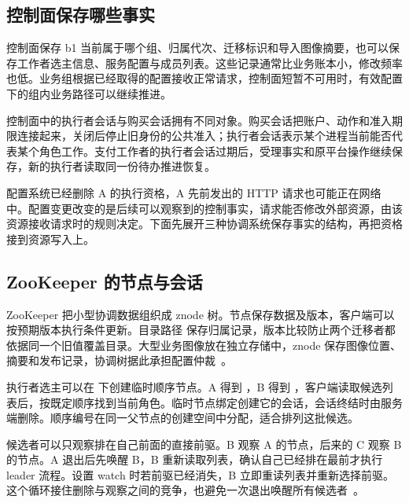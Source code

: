 \subsection*{控制面保存哪些事实}

控制面保存 b1 当前属于哪个组、归属代次、迁移标识和导入图像摘要，也可以保存工作者选主信息、服务配置与成员列表。这些记录通常比业务账本小，修改频率也低。业务组根据已经取得的配置接收正常请求，控制面短暂不可用时，有效配置下的组内业务路径可以继续推进。

控制面中的执行者会话与购买会话拥有不同对象。购买会话把账户、动作和准入期限连接起来，关闭后停止旧身份的公共准入；执行者会话表示某个进程当前能否代表某个角色工作。支付工作者的执行者会话过期后，受理事实和原平台操作继续保存，新的执行者读取同一份待办推进恢复。


配置系统已经删除 A 的执行资格，A 先前发出的 HTTP 请求也可能正在网络中。配置变更改变的是后续可以观察到的控制事实，请求能否修改外部资源，由该资源接收请求时的规则决定。下面先展开三种协调系统保存事实的结构，再把资格接到资源写入上。

\subsection*{ZooKeeper 的节点与会话}

ZooKeeper 把小型协调数据组织成 znode 树。节点保存数据及版本，客户端可以按预期版本执行条件更新。目录路径  保存归属记录，版本比较防止两个迁移者都依据同一个旧值覆盖目录。大型业务图像放在独立存储中，znode 保存图像位置、摘要和发布记录，协调树据此承担配置仲裁~\cite{zk-396-programmer}。

执行者选主可以在  下创建临时顺序节点。A 得到 ，B 得到 ，客户端读取候选列表后，按既定顺序找到当前角色。临时节点绑定创建它的会话，会话终结时由服务端删除。顺序编号在同一父节点的创建空间中分配，适合排列这批候选。

候选者可以只观察排在自己前面的直接前驱。B 观察 A 的节点，后来的 C 观察 B 的节点。A 退出后先唤醒 B，B 重新读取列表，确认自己已经排在最前才执行 leader 流程。设置 watch 时若前驱已经消失，B 立即重读列表并重新选择前驱。这个循环接住删除与观察之间的竞争，也避免一次退出唤醒所有候选者~\cite{zk-396-recipes}。


